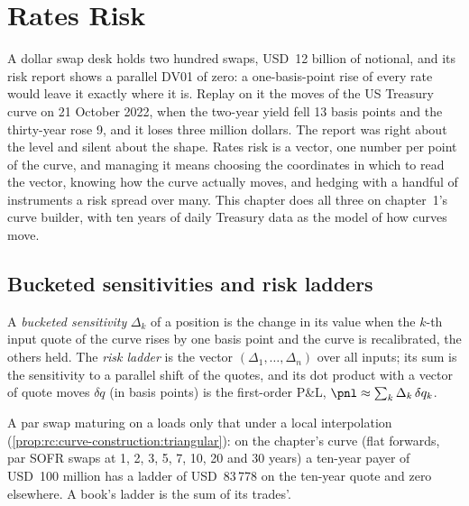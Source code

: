 \chapter{Rates Risk}\label{ch:rc:rates-risk}

A dollar swap desk holds two hundred swaps, USD~12 billion of notional, and its
risk report shows a parallel DV01 of zero: a one-basis-point rise of every
rate would leave it exactly where it is. Replay on it the moves of the US
Treasury curve on 21 October 2022, when the two-year yield fell 13 basis
points and the thirty-year rose 9, and it loses three million dollars. The
report was right about the level and silent about the shape. Rates risk is a
vector, one number per point of the curve, and managing it means choosing the
coordinates in which to read the vector, knowing how the curve actually moves,
and hedging with a handful of instruments a risk spread over many. This
chapter does all three on chapter~1's curve builder, with ten years of daily
Treasury data as the model of how curves move.

\section{Bucketed sensitivities and risk ladders}

\begin{definition}\label{def:rc:rates-risk:ladder}
A \emph{bucketed sensitivity} $\Delta_k$ of a
position is the change in its value when the $k$-th input quote of the curve
rises by one basis point and the curve is recalibrated, the others held. The
\emph{risk ladder} is the vector $(\Delta_1,\dots,\Delta_n)$
over all inputs; its sum is the sensitivity to a parallel shift of the quotes,
and its dot product with a vector of quote moves $\delta q$ (in basis points)
is the first-order P\&L, $\pnl\approx\sum_k\Delta_k\,\delta q_k$.
\end{definition}

A par swap maturing on a  loads only that  under a local
interpolation (\cref{prop:rc:curve-construction:triangular}): on the chapter's
 curve (flat forwards, par SOFR swaps at 1, 2, 3, 5, 7, 10, 20 and
30 years) a ten-year payer of USD~100 million has a ladder of USD~83\,778 on the
ten-year quote and zero elsewhere. A book's ladder is the sum of its trades'.

